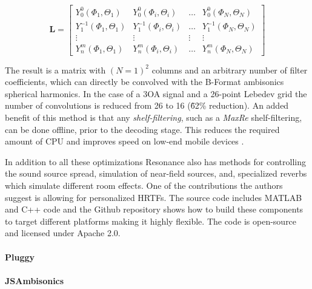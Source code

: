 \begin{equation}
\mathbf{L}=\left[\begin{array}{cccc}
Y_{0}^{0}\left(\Phi_{1}, \Theta_{1}\right) & Y_{0}^{0}\left(\Phi_{i}, \Theta_{i}\right) & \ldots & Y_{0}^{0}\left(\Phi_{N}, \Theta_{N}\right) \\
Y_{1}^{-1}\left(\Phi_{1}, \Theta_{1}\right) & Y_{1}^{-1}\left(\Phi_{i}, \Theta_{i}\right) & \ldots & Y_{1}^{-1}\left(\Phi_{N}, \Theta_{N}\right) \\
\vdots & \vdots & \vdots & \vdots \\
Y_{n}^{m}\left(\Phi_{1}, \Theta_{1}\right) & Y_{n}^{m}\left(\Phi_{i}, \Theta_{i}\right) & \ldots & Y_{n}^{m}\left(\Phi_{N}, \Theta_{N}\right)
\end{array}\right]
\label{eq:re-enc-mat}
\end{equation}


The result is a matrix with $(N=1)^2$ columns and an arbitrary number of filter coefficients, which can directly be convolved with the B-Format ambisonics spherical harmonics. In the case of a 3OA signal and a 26-point Lebedev grid the number of convolutions is reduced from 26 to 16 (\~62\% reduction). An added benefit of this method is that any \textit{shelf-filtering}, such as a \textit{MaxRe} shelf-filtering, can be done offline, prior to the decoding stage. This reduces the required amount of CPU and improves speed on low-end mobile devices \cite{gorzel2019efficient}.


In addition to all these optimizations Resonance also has methods for controlling the sound source spread, simulation of near-field sources, and, specialized reverbs which simulate different room effects. One of the contributions the authors suggest is allowing for personalized HRTFs. The source code includes MATLAB and C++ code and the Github repository shows how to build these components to target different platforms making it highly flexible. The code is open-source and licensed under Apache 2.0. 


\paragraph{Pluggy}

\paragraph{JSAmbisonics}

